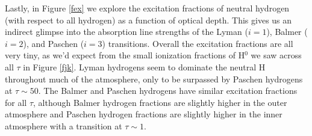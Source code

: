 \documentclass[iop,revtex4]{emulateapj}
\begin{document}
\par
Lastly, in Figure \ref{fex} we explore the excitation fractions of neutral hydrogen (with respect to all hydrogen) as a function of optical depth. This gives us an indirect glimpse into the absorption line strengths of the Lyman ($i=1$), Balmer ($i=2$), and Paschen ($i=3$) transitions. Overall the excitation fractions are all very tiny, as we'd expect from the small ionization fractions of H$^{0}$ we saw across all $\tau$ in Figure \ref{fjk}. Lyman hydrogens seem to dominate the neutral H throughout much of the atmosphere, only to be surpassed by Paschen hydrogens at $\tau\sim50$. The Balmer and Paschen hydrogens have similar excitation fractions for all $\tau$, although Balmer hydrogen fractions are slightly higher in the outer atmosphere and Paschen hydrogen fractions are slightly higher in the inner atmosphere with a transition at $\tau\sim1$.
\end{document}
